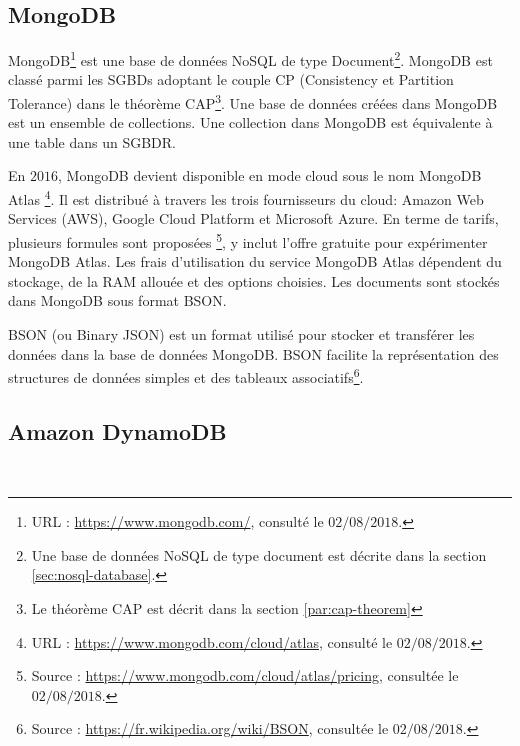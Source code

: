 \subsection{MongoDB} \label{subsubsection:mongodb}
MongoDB\footnote{URL : \url{https://www.mongodb.com/}, consulté le $02/08/2018$.} est une base de données  NoSQL de type Document\footnote{Une base de données NoSQL de type document est décrite dans la section \ref{sec:nosql-database}.}.  MongoDB est classé parmi les  SGBDs adoptant le couple CP (Consistency et Partition Tolerance) dans le théorème  CAP\footnote{Le théorème  CAP est décrit dans la section \ref{par:cap-theorem}}. Une base de données créées dans MongoDB est un ensemble de collections. Une collection dans MongoDB est équivalente à une table dans un SGBDR.
	
En $ 2016 $, MongoDB devient disponible en mode cloud sous le nom  MongoDB Atlas \footnote{URL : \url{https://www.mongodb.com/cloud/atlas}, consulté le $ 02/08/2018 $.}.  Il est distribué à travers les trois fournisseurs du cloud: Amazon Web Services (AWS), Google Cloud Platform et Microsoft Azure.  En terme de tarifs, plusieurs formules sont proposées \footnote{Source : \url{https://www.mongodb.com/cloud/atlas/pricing}, consultée le $ 02/08/2018 $.}, y inclut l'offre gratuite pour expérimenter MongoDB Atlas.  Les frais d'utilisation du service MongoDB Atlas dépendent du stockage, de la  RAM allouée et des options choisies. Les documents sont stockés dans MongoDB sous format BSON.
	
\begin{tcolorbox}
	BSON (ou Binary JSON) est un format utilisé pour stocker et transférer les données dans la base de données MongoDB. BSON facilite la représentation des structures de données simples et des tableaux associatifs\footnote{Source : \url{https://fr.wikipedia.org/wiki/BSON}, consultée le $ 02/08/2018 $.}.
\end{tcolorbox}
	
	\subsection{Amazon DynamoDB}\label{aws:dynmo}~
	
	
